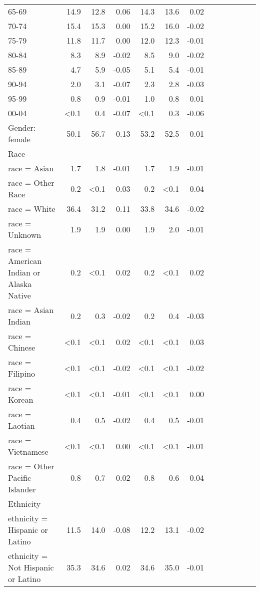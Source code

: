 \documentclass[11pt,]{article}
\begin{document}
\begin{longtable}{lrrrrrrrrrrrr}
      65-69 & 14.9 & 12.8 &  0.06 & 14.3 & 13.6 &  0.02 \\ 
      70-74 & 15.4 & 15.3 &  0.00 & 15.2 & 16.0 & -0.02 \\ 
      75-79 & 11.8 & 11.7 &  0.00 & 12.0 & 12.3 & -0.01 \\ 
      80-84 &  8.3 &  8.9 & -0.02 &  8.5 &  9.0 & -0.02 \\ 
      85-89 &  4.7 &  5.9 & -0.05 &  5.1 &  5.4 & -0.01 \\ 
      90-94 &  2.0 &  3.1 & -0.07 &  2.3 &  2.8 & -0.03 \\ 
      95-99 &  0.8 &  0.9 & -0.01 &  1.0 &  0.8 &  0.01 \\ 
      00-04 & <0.1 &  0.4 & -0.07 & <0.1 &  0.3 & -0.06 \\ 
  Gender: female & 50.1 & 56.7 & -0.13 & 53.2 & 52.5 &  0.01 \\ 
  Race &    &    &     &    &    &     \\ 
      race = Asian &  1.7 &  1.8 & -0.01 &  1.7 &  1.9 & -0.01 \\ 
      race = Other Race &  0.2 & <0.1 &  0.03 &  0.2 & <0.1 &  0.04 \\ 
      race = White & 36.4 & 31.2 &  0.11 & 33.8 & 34.6 & -0.02 \\ 
      race = Unknown &  1.9 &  1.9 &  0.00 &  1.9 &  2.0 & -0.01 \\ 
      race = American Indian or Alaska Native &  0.2 & <0.1 &  0.02 &  0.2 & <0.1 &  0.02 \\ 
      race = Asian Indian &  0.2 &  0.3 & -0.02 &  0.2 &  0.4 & -0.03 \\ 
      race = Chinese & <0.1 & <0.1 &  0.02 & <0.1 & <0.1 &  0.03 \\ 
      race = Filipino & <0.1 & <0.1 & -0.02 & <0.1 & <0.1 & -0.02 \\ 
      race = Korean & <0.1 & <0.1 & -0.01 & <0.1 & <0.1 &  0.00 \\ 
      race = Laotian &  0.4 &  0.5 & -0.02 &  0.4 &  0.5 & -0.01 \\ 
      race = Vietnamese & <0.1 & <0.1 &  0.00 & <0.1 & <0.1 & -0.01 \\ 
      race = Other Pacific Islander &  0.8 &  0.7 &  0.02 &  0.8 &  0.6 &  0.04 \\ 
  Ethnicity &    &    &     &    &    &     \\ 
      ethnicity = Hispanic or Latino & 11.5 & 14.0 & -0.08 & 12.2 & 13.1 & -0.02 \\ 
      ethnicity = Not Hispanic or Latino & 35.3 & 34.6 &  0.02 & 34.6 & 35.0 & -0.01 \\ 

\end{longtable}
\end{document}
